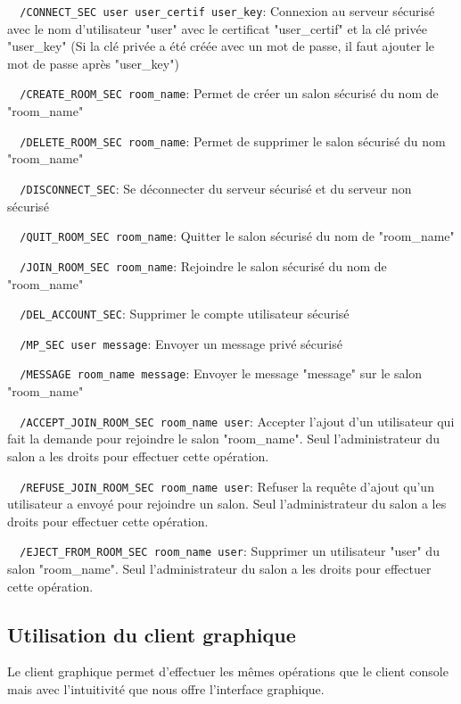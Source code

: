 \documentclass[a4paper,11pt,french]{book}
\begin{document}
\verb+	/CONNECT_SEC user user_certif user_key+: Connexion au serveur sécurisé avec le nom d'utilisateur "user" avec le certificat "user\_certif" et la clé privée "user\_key" (Si la clé privée a été créée avec un mot de passe, il faut ajouter le mot de passe après "user\_key")

\verb+	/CREATE_ROOM_SEC room_name+: Permet de créer un salon sécurisé du nom de "room\_name"

\verb+	/DELETE_ROOM_SEC room_name+: Permet de supprimer le salon sécurisé du nom "room\_name"

\verb+	/DISCONNECT_SEC+: Se déconnecter du serveur sécurisé et du serveur non sécurisé

\verb+	/QUIT_ROOM_SEC room_name+: Quitter le salon sécurisé du nom de "room\_name"

\verb+	/JOIN_ROOM_SEC room_name+: Rejoindre le salon sécurisé du nom de "room\_name"

\verb+	/DEL_ACCOUNT_SEC+: Supprimer le compte utilisateur sécurisé

\verb+	/MP_SEC user message+: Envoyer un message privé sécurisé

\verb+	/MESSAGE room_name message+: Envoyer le message "message" sur le salon "room\_name"

\verb+	/ACCEPT_JOIN_ROOM_SEC room_name user+: Accepter l'ajout d'un utilisateur qui fait la demande pour rejoindre le salon "room\_name". Seul l'administrateur du salon a les droits pour effectuer cette opération.

\verb+	/REFUSE_JOIN_ROOM_SEC room_name user+: Refuser la requête d'ajout qu'un utilisateur a envoyé pour rejoindre un salon. Seul l'administrateur du salon a les droits pour effectuer cette opération.

\verb+	/EJECT_FROM_ROOM_SEC room_name user+: Supprimer un utilisateur "user" du salon "room\_name". Seul l'administrateur du salon a les droits pour effectuer cette opération.


\subsection{Utilisation du client graphique}

Le client graphique permet d'effectuer les mêmes opérations que le client console mais avec l'intuitivité que nous offre l'interface graphique.
\end{document}
